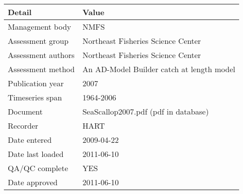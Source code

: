 \begin{table}[htb]
\centering
\begin{tabular}{lp{7cm}}
\toprule
Detail & Value \\
\midrule
Management body    & NMFS                                      \\
Assessment group   & Northeast Fisheries Science Center        \\
Assessment authors & Northeast Fisheries Science Center        \\
Assessment method  & An AD-Model Builder catch at length model \\
Publication year   & 2007                                      \\
Timeseries span    & 1964-2006                                 \\
Document           & SeaScallop2007.pdf (pdf in database)      \\
Recorder           & HART                                      \\
Date entered       & 2009-04-22                                \\
Date last loaded   & 2011-06-10                                \\
QA/QC complete     & YES                                       \\
Date approved      & 2011-06-10                                \\
\bottomrule
\end{tabular}
\label{tab:assessdet}
\end{table}
